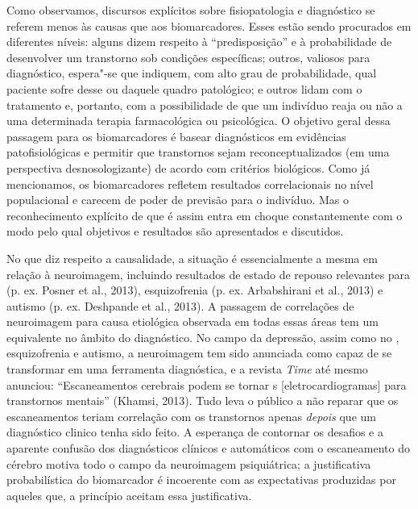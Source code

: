 Como observamos, discursos explícitos sobre fisiopatologia e diagnóstico
se referem menos às causas que aos biomarcadores. Esses estão sendo
procurados em diferentes níveis: alguns dizem respeito à
``predisposição'' e à probabilidade de desenvolver um transtorno sob
condições específicas; outros, valiosos para diagnóstico, espera"-se que
indiquem, com alto grau de probabilidade, qual paciente sofre desse ou
daquele quadro patológico; e outros lidam com o tratamento e, portanto,
com a possibilidade de que um indivíduo reaja ou não a uma determinada
terapia farmacológica ou psicológica. O objetivo geral dessa passagem
para os biomarcadores é basear diagnósticos em evidências
patofisiológicas e permitir que transtornos sejam reconceptualizados (em
uma perspectiva desnosologizante) de acordo com critérios biológicos.
Como já mencionamos, os biomarcadores refletem resultados correlacionais
no nível populacional e carecem de poder de previsão para o indivíduo.
Mas o reconhecimento explícito de que é assim entra em choque
constantemente com o modo pelo qual objetivos e resultados são
apresentados e discutidos.

No que diz respeito a causalidade, a situação é essencialmente a mesma
em relação à neuroimagem, incluindo resultados de estado de repouso
relevantes para  (p. ex. Posner et al., 2013), esquizofrenia (p. ex.
Arbabshirani et al., 2013) e autismo (p. ex. Deshpande et al., 2013). A
passagem de correlações de neuroimagem para causa etiológica observada
em todas essas áreas tem um equivalente no âmbito do diagnóstico. No
campo da depressão, assim como no , esquizofrenia e autismo, a
neuroimagem tem sido anunciada como capaz de se transformar em uma
ferramenta diagnóstica, e a revista \emph{Time} até mesmo anunciou:
``Escaneamentos cerebrais podem se tornar s {[}eletrocardiogramas{]}
para transtornos mentais'' (Khamsi, 2013). Tudo leva o público a não
reparar que os escaneamentos teriam correlação com os transtornos apenas
\emph{depois} que um diagnóstico clinico tenha sido feito. A esperança
de contornar os desafios e a aparente confusão dos diagnósticos clínicos
e automáticos com o escaneamento do cérebro motiva todo o campo da
neuroimagem psiquiátrica; a justificativa probabilística do biomarcador
é incoerente com as expectativas produzidas por aqueles que, a princípio
aceitam essa justificativa.

